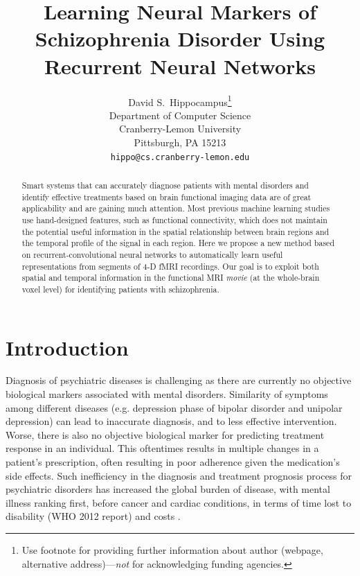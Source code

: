 \documentclass{article}
\title{Learning Neural Markers of Schizophrenia Disorder Using Recurrent Neural Networks}
\author{
  David S.~Hippocampus\thanks{Use footnote for providing further
    information about author (webpage, alternative
    address)---\emph{not} for acknowledging funding agencies.} \\
  Department of Computer Science\\
  Cranberry-Lemon University\\
  Pittsburgh, PA 15213 \\
  \texttt{hippo@cs.cranberry-lemon.edu} \\
}
\begin{document}

\maketitle

\begin{abstract}

Smart systems that can accurately diagnose patients with mental disorders and identify effective treatments based on brain functional imaging data are of great applicability and are gaining much attention. Most previous machine learning studies use hand-designed features, such as functional connectivity, which does not maintain the potential useful information in the spatial relationship between brain regions and the temporal profile of the signal in each region. Here we propose a new method based on recurrent-convolutional neural networks to automatically learn useful representations from segments of 4-D fMRI recordings. Our goal is to exploit both spatial and temporal information in the functional MRI \textit{movie} (at the whole-brain voxel level) for identifying patients with schizophrenia. %

\end{abstract}

\section{Introduction}

Diagnosis of psychiatric diseases is challenging as there are currently no objective biological markers associated with mental disorders. Similarity of symptoms among different diseases (e.g. depression phase of bipolar disorder and unipolar depression) can lead to inaccurate diagnosis, and to less effective intervention. Worse, there is also no objective biological marker for predicting treatment response in an individual. This oftentimes results in multiple changes in a patient's prescription, often resulting in poor adherence given the medication's side effects. Such inefficiency in the diagnosis and treatment prognosis process for psychiatric disorders has increased the global burden of disease, with mental illness ranking first, before cancer and cardiac conditions, in terms of time lost to disability (WHO 2012 report) and costs \citep{Roehrig2016}.
\end{document}
